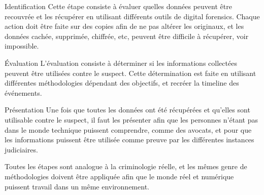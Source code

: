 \documentclass[a4paper]{article}
\begin{document}
	\begin{parag}{Identification}
		Cette étape consiste à évaluer quelles données peuvent être recouvrée et les récupérer en utilisant différents outils de digital forensics. Chaque action doit être faite sur des copies afin de ne pas altérer les originaux, et les données cachée, supprimée, chiffrée, etc, peuvent être difficile à récupérer, voir impossible.
	\end{parag}

	\begin{parag}{Évaluation}
		L’évaluation consiste à déterminer si les informations collectées peuvent être utilisées contre le suspect. Cette détermination est faite en utilisant différentes méthodologies dépendant des objectifs, et recréer la timeline des événements.
	\end{parag}

	\begin{parag}{Présentation}
		Une fois que toutes les données ont été récupérées et qu'elles sont utilisable contre le suspect, il faut les présenter afin que les personnes n'étant pas dans le monde technique puissent comprendre, comme des avocats, et pour que les informations puissent être utilisée comme preuve par les différentes instances judiciaires.
	\end{parag}

	\bigbreak

	Toutes les étapes sont analogue à la criminologie réelle, et les mêmes genre de méthodologies doivent être appliquée afin que le monde réel et numérique puissent travail dans un même environnement.
\end{document}
